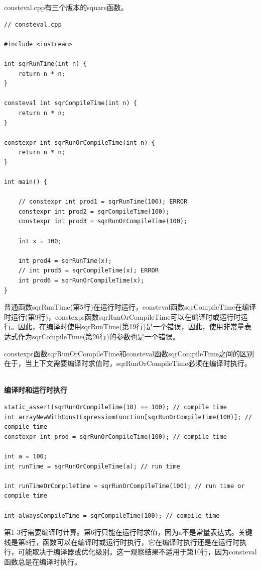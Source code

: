 consteval.cpp有三个版本的square函数。

\begin{lstlisting}[style=styleCXX]
// consteval.cpp

#include <iostream>

int sqrRunTime(int n) {
	return n * n;
}

consteval int sqrCompileTime(int n) {
	return n * n;
}

constexpr int sqrRunOrCompileTime(int n) {
	return n * n;
}

int main() {

	// constexpr int prod1 = sqrRunTime(100); ERROR
	constexpr int prod2 = sqrCompileTime(100);
	constexpr int prod3 = sqrRunOrCompileTime(100);

	int x = 100;
	
	int prod4 = sqrRunTime(x);
	// int prod5 = sqrCompileTime(x); ERROR
	int prod6 = sqrRunOrCompileTime(x);
}
\end{lstlisting}

普通函数sqrRunTime(第5行)在运行时运行，consteval函数sqrCompileTime在编译时运行(第9行)，constexpr函数sqrRunOrCompileTime可以在编译时或运行时运行。因此，在编译时使用sqrRunTime(第19行)是一个错误，因此，使用非常量表达式作为sqrCompileTime(第26行)的参数也是一个错误。

constexpr函数sqrRunOrCompileTime和consteval函数sqrCompileTime之间的区别在于，当上下文需要编译时求值时，sqrRunOrCompileTime必须在编译时执行。

\hspace*{\fill} \\ %
\noindent
\textbf{编译时和运行时执行}
\begin{lstlisting}[style=styleCXX]
static_assert(sqrRunOrCompileTime(10) == 100); // compile time
int arrayNewWithConstExpressiomFunction[sqrRunOrCompileTime(100)]; // compile time
constexpr int prod = sqrRunOrCompileTime(100); // compile time

int a = 100;
int runTime = sqrRunOrCompileTime(a); // run time

int runTimeOrCompiletime = sqrRunOrCompileTime(100); // run time or compile time

int alwaysCompileTime = sqrCompileTime(100); // compile time
\end{lstlisting}

第1-3行需要编译时计算。第6行只能在运行时求值，因为a不是常量表达式。关键线是第8行，函数可以在编译时或运行时执行，它在编译时执行还是在运行时执行，可能取决于编译器或优化级别。这一观察结果不适用于第10行，因为consteval函数总是在编译时执行。

